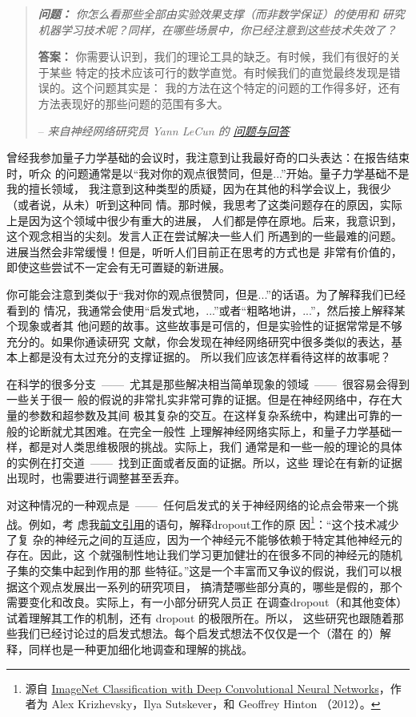 \begin{quote}
{\itshape \textbf{问题：} 你怎么看那些全部由实验效果支撑（而非数学保证）的使用和
  研究机器学习技术呢？同样，在哪些场景中，你已经注意到这些技术失效了？}

\textbf{答案：} 你需要认识到，我们的理论工具的缺乏。有时候，我们有很好的关于某些
特定的技术应该可行的数学直觉。有时候我们的直觉最终发现是错误的。这个问题其实是：
我的方法在这个特定的问题的工作得多好，还有方法表现好的那些问题的范围有多大。

-- {\itshape 来自神经网络研究员 Yann LeCun 的%
  \href{http://www.reddit.com/r/MachineLearning/comments/25lnbt/ama_yann_lecun/chivdv7}{
    问题与回答}}
\end{quote}

曾经我参加量子力学基础的会议时，我注意到让我最好奇的口头表达：在报告结束时，听众
的问题通常是以“我对你的观点很赞同，但是...”开始。量子力学基础不是我的擅长领域，
我注意到这种类型的质疑，因为在其他的科学会议上，我很少（或者说，从未）听到这种同
情。那时候，我思考了这类问题存在的原因，实际上是因为这个领域中很少有重大的进展，
人们都是停在原地。后来，我意识到，这个观念相当的尖刻。发言人正在尝试解决一些人们
所遇到的一些最难的问题。进展当然会非常缓慢！但是，听听人们目前正在思考的方式也是
非常有价值的，即使这些尝试不一定会有无可置疑的新进展。

你可能会注意到类似于“我对你的观点很赞同，但是...”的话语。为了解释我们已经看到的
情况，我通常会使用“启发式地，...”或者“粗略地讲，...”，然后接上解释某个现象或者其
他问题的故事。这些故事是可信的，但是实验性的证据常常是不够充分的。如果你通读研究
文献，你会发现在神经网络研究中很多类似的表达，基本上都是没有太过充分的支撑证据的。
所以我们应该怎样看待这样的故事呢？

在科学的很多分支~——~尤其是那些解决相当简单现象的领域~——~很容易会得到一些关于很一
般的假说的非常扎实非常可靠的证据。但是在神经网络中，存在大量的参数和超参数及其间
极其复杂的交互。在这样复杂系统中，构建出可靠的一般的论断就尤其困难。在完全一般性
上理解神经网络实际上，和量子力学基础一样，都是对人类思维极限的挑战。实际上，我们
通常是和一些一般的理论的具体的实例在打交道~——~找到正面或者反面的证据。所以，这些
理论在有新的证据出现时，也需要进行调整甚至丢弃。

对这种情况的一种观点是~——~任何启发式的关于神经网络的论点会带来一个挑战。例如，考
虑我\hyperref[dropout_explanation]{前文引用}的语句，解释\gls*{dropout}工作的原
因\footnote{源自
  \href{https://papers.nips.cc/paper/4824-imagenet-classification-with-deep-convolutional-neural-networks.pdf}{ImageNet
    Classification with Deep Convolutional Neural Networks}，作者为 Alex
  Krizhevsky，Ilya Sutskever，和 Geoffrey Hinton （2012）。}：“这个技术减少了复
杂的神经元之间的互适应，因为一个神经元不能够依赖于特定其他神经元的存在。因此，这
个就强制性地让我们学习更加健壮的在很多不同的神经元的随机子集的交集中起到作用的那
些特征。”这是一个丰富而又争议的假说，我们可以根据这个观点发展出一系列的研究项目，
搞清楚哪些部分真的，哪些是假的，那个需要变化和改良。实际上，有一小部分研究人员正
在调查dropout（和其他变体）试着理解其工作的机制，还有 dropout 的极限所在。所以，
这些研究也跟随着那些我们已经讨论过的启发式想法。每个启发式想法不仅仅是一个（潜在
  的）解释，同样也是一种更加细化地调查和理解的挑战。

